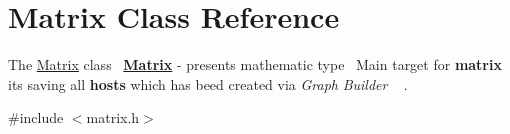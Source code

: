 \hypertarget{class_matrix}{}\section{Matrix Class Reference}
\label{class_matrix}


The \mbox{\hyperlink{class_matrix}{Matrix}} class~\newline
{\bfseries{\mbox{\hyperlink{class_matrix}{Matrix}}}} -\/ presents mathematic type~\newline
Main target for {\bfseries{matrix}} it\textquotesingle{}s saving all {\bfseries{hosts}} which has beed created via {\itshape Graph} {\itshape Builder} ~\newline
.  




{\ttfamily \#include $<$matrix.\+h$>$}

